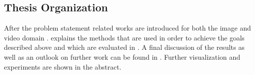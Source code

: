 \subsection{Thesis Organization}
After the problem statement  related works are
introduced for both the image and video domain .
 explains the methods that are used in order to
achieve the goals described above and which are evaluated in
. A final discussion of the results
as well as an outlook on further work can be found in
. Further visualization and experiments are
shown in the abstract.

%
